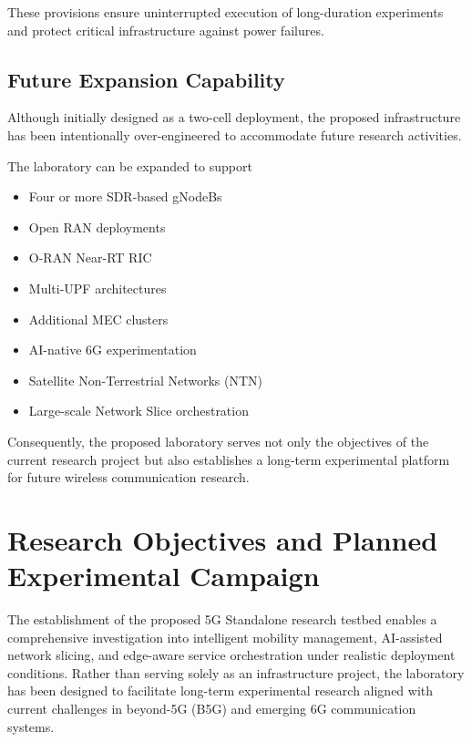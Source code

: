 \documentclass[12pt,a4paper]{article}\usepackage[a4paper,margin=1in]{geometry}\usepackage{graphicx}\usepackage{longtable}\usepackage{booktabs}\usepackage{hyperref}\usepackage{enumitem}\usepackage{amsmath}\usepackage{tikz}\usepackage{pgfgantt}\usepackage{setspace}\setstretch{1.15}\usetikzlibrary{positioning,arrows.meta,shapes.geometric}
\begin{document}
	These provisions ensure uninterrupted execution of long-duration experiments and protect critical infrastructure against power failures.
	
	
	\subsection{Future Expansion Capability}
	
	Although initially designed as a two-cell deployment, the proposed infrastructure has been intentionally over-engineered to accommodate future research activities.
	
	The laboratory can be expanded to support
	
	\begin{itemize}
		
		\item Four or more SDR-based gNodeBs
		
		\item Open RAN deployments
		
		\item O-RAN Near-RT RIC
		
		\item Multi-UPF architectures
		
		\item Additional MEC clusters
		
		\item AI-native 6G experimentation
		
		\item Satellite Non-Terrestrial Networks (NTN)
		
		\item Large-scale Network Slice orchestration
		
	\end{itemize}
	
	Consequently, the proposed laboratory serves not only the objectives of the current research project but also establishes a long-term experimental platform for future wireless communication research.
	
	\section{Research Objectives and Planned Experimental Campaign}
	
	The establishment of the proposed 5G Standalone research testbed enables a comprehensive investigation into intelligent mobility management, AI-assisted network slicing, and edge-aware service orchestration under realistic deployment conditions. Rather than serving solely as an infrastructure project, the laboratory has been designed to facilitate long-term experimental research aligned with current challenges in beyond-5G (B5G) and emerging 6G communication systems.
	
\end{document}
